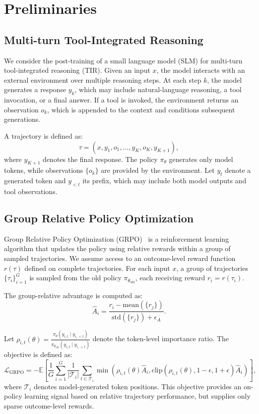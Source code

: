 \section{Preliminaries}

\subsection{Multi-turn Tool-Integrated Reasoning}

We consider the post-training of a small language model (SLM) for multi-turn tool-integrated reasoning (TIR). Given an input $x$, the model interacts with an external environment over multiple reasoning steps. At each step $k$, the model generates a response $y_k$, which may include natural-language reasoning, a tool invocation, or a final answer. If a tool is invoked, the environment returns an observation $o_k$, which is appended to the context and conditions subsequent generations.

A trajectory is defined as:
\begin{equation}
    \tau = (x, y_1, o_1, \ldots, y_K, o_K, y_{K+1}),
\end{equation}
where $y_{K+1}$ denotes the final response. The policy $\pi_\theta$ generates only model tokens, while observations $\{o_k\}$ are provided by the environment. Let $y_t$ denote a generated token and $y_{<t}$ its prefix, which may include both model outputs and tool observations.


\subsection{Group Relative Policy Optimization}

Group Relative Policy Optimization (GRPO)~\citep{grpo} is a reinforcement learning algorithm that updates the policy using relative rewards within a group of sampled trajectories. We assume access to an outcome-level reward function $r(\tau)$ defined on complete trajectories. For each input $x$, a group of trajectories $\{\tau_i\}_{i=1}^G$ is sampled from the old policy $\pi_{\theta_{\mathrm{old}}}$, each receiving reward $r_i = r(\tau_i)$.

The group-relative advantage is computed as:
\begin{equation}
    \hat{A}_i =
    \frac{r_i - \mathrm{mean}(\{r_j\})}
    {\mathrm{std}(\{r_j\}) + \epsilon_A}.
\label{eq:advantage}
\end{equation}

Let $\rho_{i,t}(\theta) = \frac{\pi_\theta(y_{i,t} \mid y_{i,<t})}{\pi_{\theta_{\mathrm{old}}}(y_{i,t} \mid y_{i,<t})}$ denote the token-level importance ratio. The objective is defined as:
\begin{equation}
\mathcal{L}_{\mathrm{GRPO}}
=
-
\mathbb{E}
\left[
\frac{1}{G}
\sum_{i=1}^{G}
\frac{1}{|\mathcal{T}_i|}
\sum_{t \in \mathcal{T}_i}
\min
\left(
\rho_{i,t}(\theta)\hat{A}_i,
\mathrm{clip}(\rho_{i,t}(\theta), 1-\epsilon, 1+\epsilon)\hat{A}_i
\right)
\right],
\label{eq:grpo}
\end{equation}
where $\mathcal{T}_i$ denotes model-generated token positions.
This objective provides an on-policy learning signal based on relative trajectory performance, but supplies only sparse outcome-level rewards.


